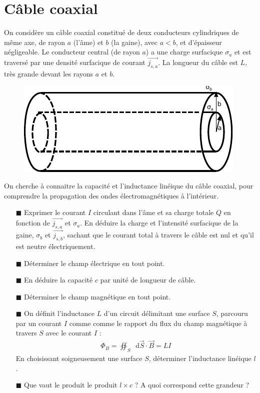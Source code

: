 \documentclass{report}
\newcommand*\dif{\mathop{}\!\mathrm{d}}
\begin{document}
\newpage

\section*{Câble coaxial}

On considère un câble coaxial constitué de deux conducteurs cylindriques de même axe, de rayon $a$ (l'âme) et $b$ (la gaine), avec $a<b$, et d'épaisseur négligeable. Le conducteur central (de rayon $a$) a une charge surfacique $\sigma_a$ et est traversé par une densité surfacique de courant $\vec{j_{s,a}}$. La longueur du câble est $L$, très grande devant les rayons $a$ et $b$.  

\begin{figure}[h!]
\centering
		\includegraphics[scale=1]{em2.pdf}
\end{figure}

On cherche à connaitre la capacité et l'inductance linéique du câble coaxial, pour comprendre la propagation des ondes électromagnétiques à l'intérieur. 

\begin{itemize}

	\item[$\blacksquare$] Exprimer le courant $I$ circulant dans l'âme et sa charge totale $Q$ en fonction de $\vec{j_{s,a}}$ et $\sigma_a$. En déduire la charge et l'intensité surfacique de la gaine, $\sigma_b$ et $\vec{j_{s,b}}$, sachant que le courant total à travers le câble est nul et qu'il est neutre électriquement.
	
	\item[$\blacksquare$] Déterminer le champ électrique en tout point.

	\item[$\blacksquare$] En déduire la capacité $c$ par unité de longueur de câble. 
	
	\item[$\blacksquare$]	 Déterminer le champ magnétique en tout point. 
	
	\item[$\blacksquare$] On définit l'inductance $L$ d'un circuit délimitant une surface $S$, parcouru par un courant $I$ comme  comme le rapport du flux du champ magnétique à travers $S$ avec le courant $I$ :
	\begin{align*}
		\Phi_B=\oiint_S \dif \vec{S}\cdot\vec{B}=LI
	\end{align*}
En choisissant soigneusement une surface $S$, déterminer l'inductance linéique $l$. 

	\item[$\blacksquare$] Que vaut le produit le produit $l\times c$ ? A quoi correspond cette grandeur ?
	
\end{itemize}
\end{document}
